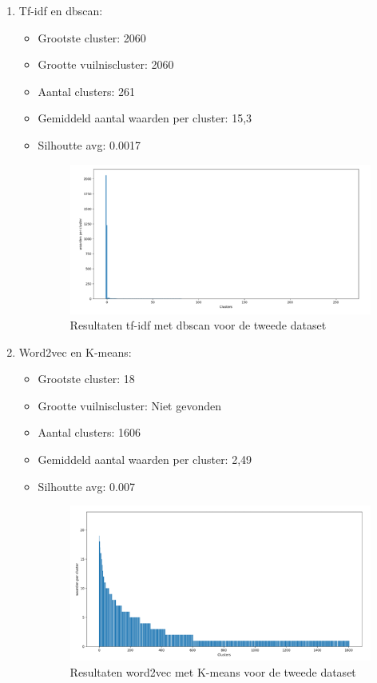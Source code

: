 \begin{enumerate}
    \newpage
    \item Tf-idf en dbscan:
    \begin{itemize}
        \item Grootste cluster: 2060
        \item Grootte vuilniscluster: 2060
        \item Aantal clusters: 261
        \item Gemiddeld aantal waarden per cluster: 15,3
        \item Silhoutte avg: 0.0017
        \\\indent
        \begin{figure}[h]
            \centering
            \includegraphics[width=0.7\linewidth]{../foto's/winedatatfidfdbscan}
            \caption{Resultaten tf-idf met dbscan voor de tweede dataset}
            \label{fig:dataset2_tf-idf_dbscan}
        \end{figure}
    \end{itemize}

    \newpage
    \item Word2vec en K-means:
    \begin{itemize}
        \item Grootste cluster: 18
        \item Grootte vuilniscluster: Niet gevonden
        \item Aantal clusters: 1606
        \item Gemiddeld aantal waarden per cluster: 2,49
        \item Silhoutte avg:  0.007

        \begin{figure}[h]
            \centering
            \includegraphics[width=0.7\linewidth]{../foto's/winedataword2veckmeans}
            \caption{Resultaten word2vec met K-means voor de tweede dataset}
            \label{fig:dataset2_word2vec_kmeans}
        \end{figure}
    \end{itemize}
    \newpage


\end{enumerate}
